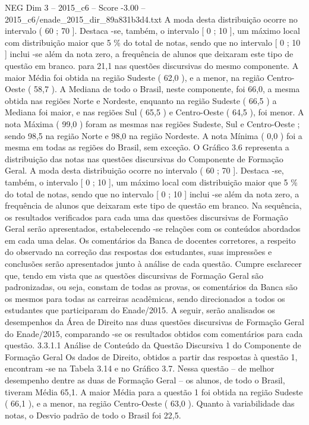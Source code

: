 \begin{textsample}{NEG Dim 3 – 2015\_c6 – Score -3.00 – 2015\_c6/enade\_2015\_dir\_89a831b3d4.txt}
A moda desta distribuição ocorre no intervalo ( 60 ; 70 ].
Destaca -se, também, o intervalo [ 0 ; 10 ], um máximo local com distribuição maior que 5 \% do total de notas, sendo que no intervalo [ 0 ; 10 ] inclui -se além da nota zero, a frequência de alunos que deixaram este tipo de questão em branco. para 21,1 nas questões discursivas do mesmo componente.
A maior Média foi obtida na região Sudeste ( 62,0 ), e a menor, na região Centro-Oeste ( 58,7 ).
A Mediana de todo o Brasil, neste componente, foi 66,0, a mesma obtida nas regiões Norte e Nordeste, enquanto na região Sudeste ( 66,5 ) a Mediana foi maior, e nas regiões Sul ( 65,5 ) e Centro-Oeste ( 64,5 ), foi menor.
A nota Máxima ( 99,0 ) foram as mesmas nas regiões Sudeste, Sul e Centro-Oeste ; sendo 98,5 na região Norte e 98,0 na região Nordeste.
A nota Mínima ( 0,0 ) foi a mesma em todas as regiões do Brasil, sem exceção.
O Gráfico 3.6 representa a distribuição das notas nas questões discursivas do Componente de Formação Geral.
A moda desta distribuição ocorre no intervalo ( 60 ; 70 ].
Destaca -se, também, o intervalo [ 0 ; 10 ], um máximo local com distribuição maior que 5 \% do total de notas, sendo que no intervalo [ 0 ; 10 ] inclui -se além da nota zero, a frequência de alunos que deixaram este tipo de questão em branco.
Na sequência, os resultados verificados para cada uma das questões discursivas de Formação Geral serão apresentados, estabelecendo -se relações com os conteúdos abordados em cada uma delas.
Os comentários da Banca de docentes corretores, a respeito do observado na correção das respostas dos estudantes, suas impressões e conclusões serão apresentados junto à análise de cada questão.
Cumpre esclarecer que, tendo em vista que as questões discursivas de Formação Geral são padronizadas, ou seja, constam de todas as provas, os comentários da Banca são os mesmos para todas as carreiras acadêmicas, sendo direcionados a todos os estudantes que participaram do Enade/2015.
A seguir, serão analisados os desempenhos da Área de Direito nas duas questões discursivas de Formação Geral do Enade/2015, comparando -se os resultados obtidos com comentários para cada questão. 3.3.1.1 Análise de Conteúdo da Questão Discursiva 1 do Componente de Formação Geral Os dados de Direito, obtidos a partir das respostas à questão 1, encontram -se na Tabela 3.14 e no Gráfico 3.7.
Nessa questão – de melhor desempenho dentre as duas de Formação Geral – os alunos, de todo o Brasil, tiveram Média 65,1.
A maior Média para a questão 1 foi obtida na região Sudeste ( 66,1 ), e a menor, na região Centro-Oeste ( 63,0 ).
Quanto à variabilidade das notas, o Desvio padrão de todo o Brasil foi 22,5.

\end{textsample}
